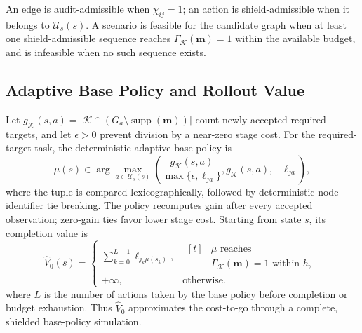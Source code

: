 \documentclass{IEEEtaes}
\begin{document}
An edge is audit-admissible when $\chi_{ij}=1$; an action is shield-admissible when it belongs to $\mathcal U_s(s)$. A scenario is feasible for the candidate graph when at least one shield-admissible sequence reaches $\Gamma_{\mathcal K}(\mathbf m)=1$ within the available budget, and is infeasible when no such sequence exists.

\subsection{Adaptive Base Policy and Rollout Value}

Let $g_{\mathcal K}(s,a)=|\mathcal K\cap(G_a\setminus\operatorname{supp}(\mathbf m))|$ count newly accepted required targets, and let $\epsilon>0$ prevent division by a near-zero stage cost. For the required-target task, the deterministic adaptive base policy is
\begin{equation}
  \mu(s)\in\arg\max_{a\in\mathcal U_s(s)}
  \left(\frac{g_{\mathcal K}(s,a)}{\max\{\epsilon,\ell_{ja}\}},
  g_{\mathcal K}(s,a),-\ell_{ja}\right),
  \label{eq:base-policy}
\end{equation}
where the tuple is compared lexicographically, followed by deterministic node-identifier tie breaking. The policy recomputes gain after every accepted observation; zero-gain ties favor lower stage cost. Starting from state $s$, its completion value is
\begin{equation}
  \widehat V_0(s)=
  \begin{cases}
  \sum_{k=0}^{L-1}\ell_{j_k\mu(s_k)}, &
  \begin{aligned}[t]
    &\mu\text{ reaches}\\
    &\Gamma_{\mathcal K}(\mathbf m)=1\text{ within }h,
  \end{aligned}\\[2pt]
  +\infty, & \text{otherwise}.
  \end{cases}
  \label{eq:base-value}
\end{equation}
where $L$ is the number of actions taken by the base policy before completion or budget exhaustion. Thus $\widehat V_0$ approximates the cost-to-go through a complete, shielded base-policy simulation.
\end{document}
